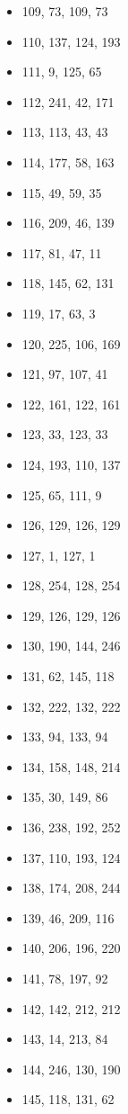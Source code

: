 \documentclass[12pt, fleqn]{report}                             %
\theoremstyle{break}                                            %
\begin{document}
\begin{multicols}{3}
\begin{itemize}
        \item 109, 73, 109, 73
        \item 110, 137, 124, 193
        \item 111, 9, 125, 65
        \item 112, 241, 42, 171
        \item 113, 113, 43, 43
        \item 114, 177, 58, 163
        \item 115, 49, 59, 35
        \item 116, 209, 46, 139
        \item 117, 81, 47, 11
        \item 118, 145, 62, 131
        \item 119, 17, 63, 3
        \item 120, 225, 106, 169
        \item 121, 97, 107, 41
        \item 122, 161, 122, 161
        \item 123, 33, 123, 33
        \item 124, 193, 110, 137
        \item 125, 65, 111, 9
        \item 126, 129, 126, 129
        \item 127, 1, 127, 1
        \item 128, 254, 128, 254
        \item 129, 126, 129, 126
        \item 130, 190, 144, 246
        \item 131, 62, 145, 118
        \item 132, 222, 132, 222
        \item 133, 94, 133, 94
        \item 134, 158, 148, 214
        \item 135, 30, 149, 86
        \item 136, 238, 192, 252
        \item 137, 110, 193, 124
        \item 138, 174, 208, 244
        \item 139, 46, 209, 116
        \item 140, 206, 196, 220
        \item 141, 78, 197, 92
        \item 142, 142, 212, 212
        \item 143, 14, 213, 84
        \item 144, 246, 130, 190
        \item 145, 118, 131, 62

\end{itemize}
\end{multicols}
\end{document}
